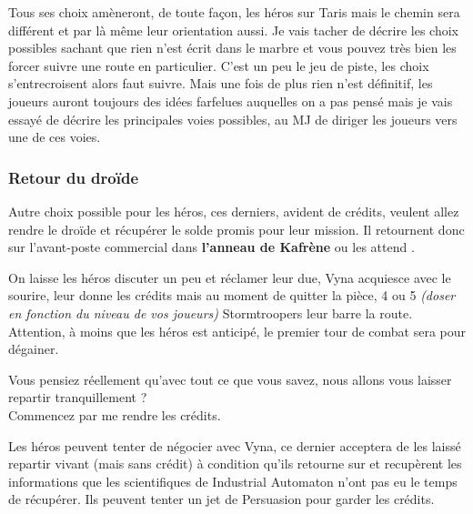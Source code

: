Tous ses choix amèneront, de toute façon, les héros sur Taris mais le chemin sera différent et par là même leur orientation aussi. Je vais tacher de décrire les choix possibles sachant que rien n’est écrit dans le marbre et vous pouvez très bien les forcer suivre une route en particulier. C'est un peu le jeu de piste, les choix s'entrecroisent alors faut suivre. Mais une fois de plus rien n'est définitif, les joueurs auront toujours des idées farfelues auquelles on a pas pensé mais je vais essayé de décrire les principales voies possibles, au MJ de diriger les joueurs vers une de ces voies.


\subsubsection{Retour du droïde} \label{sec:retour-du-droide}

Autre choix possible pour les héros, ces derniers, avident de crédits, veulent allez rendre le droïde et récupérer le solde promis pour leur mission. Il retournent donc sur l'avant-poste commercial dans \textbf{l'anneau de Kafrène} ou les attend .

On laisse les héros discuter un peu et réclamer leur due, Vyna acquiesce avec le sourire, leur donne les crédits mais au moment de quitter la pièce, 4 ou 5 \textit{(doser en fonction du niveau de vos joueurs)} Stormtroopers leur barre la route. Attention, à moins que les héros est anticipé, le premier tour de combat sera pour dégainer.

\begin{quotebox}
    Vous pensiez réellement qu'avec tout ce que vous savez, nous allons vous laisser repartir tranquillement ?\\
    Commencez par me rendre les crédits.
\end{quotebox}

Les héros peuvent tenter de négocier avec Vyna, ce dernier acceptera de les laissé repartir vivant (mais sans crédit) à condition qu'ils retourne sur  et recupèrent les informations que les scientifiques de Industrial Automaton n'ont pas eu le temps de récupérer. Ils peuvent tenter un jet de Persuasion pour garder les crédits.\\


